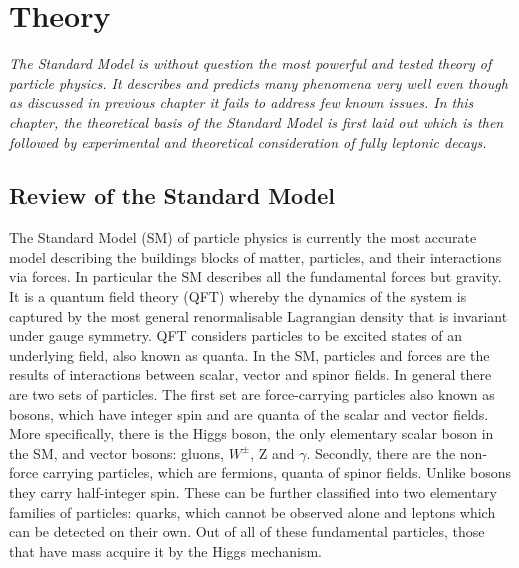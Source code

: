 \chapter{Theory}
\label{stheory}
\textit{The Standard Model is without question the most powerful and tested theory of particle physics. It describes and predicts many phenomena very well even though as discussed in previous chapter it fails to address few known issues. In this chapter, the theoretical basis of the Standard Model is first laid out which is then followed by experimental and theoretical consideration of fully leptonic decays.}



\section{Review of the Standard Model}
The Standard Model (\gls{SM}) of particle physics is currently the most accurate model describing the buildings blocks of matter, particles, and their interactions via forces. In particular the \gls{SM} describes all the fundamental forces but gravity. It is a quantum field theory (\gls{QFT}) whereby the dynamics of the system is captured by the most general renormalisable Lagrangian density that is invariant under gauge symmetry. \gls{QFT} considers particles to be excited states of an underlying field, also known as quanta. In the \gls{SM}, particles and forces are the results of interactions between scalar, vector and spinor fields. In general there are two sets of particles. The first set are force-carrying particles also known as bosons, which have integer spin and are quanta of the scalar and vector fields. More specifically, there is the Higgs boson, the only elementary scalar boson in the \gls{SM}, and vector bosons: gluons, $W^{\pm}$, Z and $\gamma$. Secondly, there are the non-force carrying particles, which are fermions, quanta of spinor fields. Unlike bosons they carry half-integer spin. These can be further classified into two elementary families of particles: quarks, which cannot be observed alone and leptons which can be detected on their own. Out of all of these fundamental particles, those that have mass acquire it by the Higgs mechanism.


